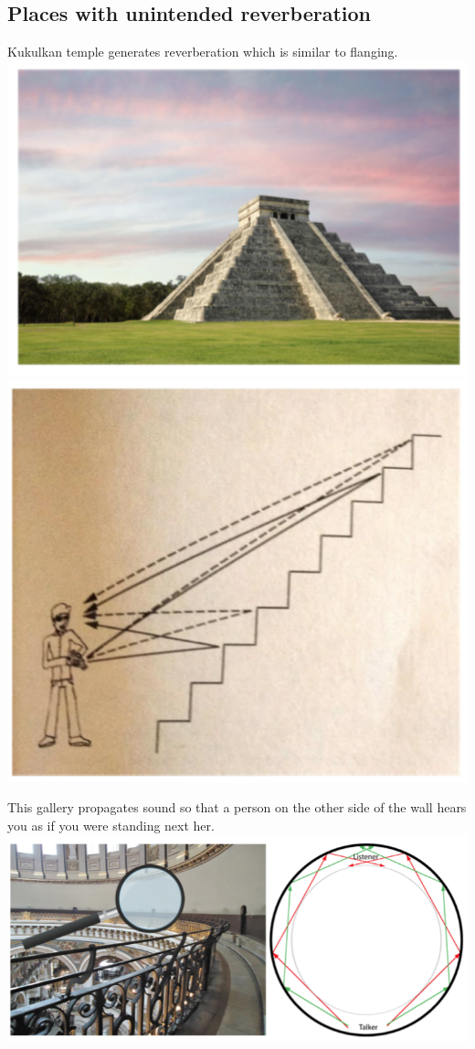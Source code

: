 \documentclass[11pt]{article}
\makeatletter
\def\maxwidth{\ifdim\Gin@nat@width>\linewidth\linewidth
    \else\Gin@nat@width\fi}
\let\Oldincludegraphics\includegraphics
\renewcommand{\includegraphics}[1]{\Oldincludegraphics[width=.8\maxwidth]{#1}}
\makeatother
\begin{document}
    \hypertarget{places-with-unintended-reverberation}{%
\subsection{Places with unintended
reverberation}\label{places-with-unintended-reverberation}}

Kukulkan temple generates reverberation which is similar to flanging.
\includegraphics{images/kukulkan.png}
\includegraphics{images/kukulkan2.png}

This gallery propagates sound so that a person on the other side of the
wall hears you as if you were standing next her.
\includegraphics{images/whispering_gallery.png}
\end{document}
